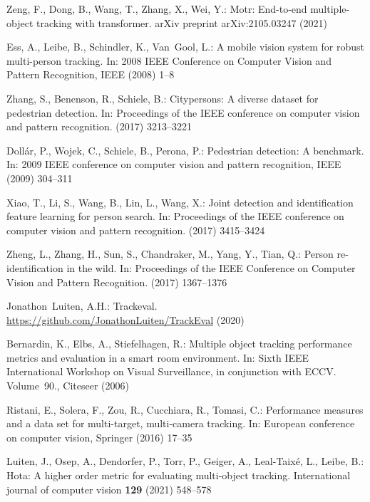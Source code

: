 \documentclass[runningheads]{llncs}
\begin{document}
\begin{thebibliography}{10}
Zeng, F., Dong, B., Wang, T., Zhang, X., Wei, Y.:
\newblock Motr: End-to-end multiple-object tracking with transformer.
\newblock arXiv preprint arXiv:2105.03247 (2021)

Ess, A., Leibe, B., Schindler, K., Van~Gool, L.:
\newblock A mobile vision system for robust multi-person tracking.
\newblock In: 2008 IEEE Conference on Computer Vision and Pattern Recognition,
  IEEE (2008)  1--8

Zhang, S., Benenson, R., Schiele, B.:
\newblock Citypersons: A diverse dataset for pedestrian detection.
\newblock In: Proceedings of the IEEE conference on computer vision and pattern
  recognition. (2017)  3213--3221

Doll{\'a}r, P., Wojek, C., Schiele, B., Perona, P.:
\newblock Pedestrian detection: A benchmark.
\newblock In: 2009 IEEE conference on computer vision and pattern recognition,
  IEEE (2009)  304--311

Xiao, T., Li, S., Wang, B., Lin, L., Wang, X.:
\newblock Joint detection and identification feature learning for person
  search.
\newblock In: Proceedings of the IEEE conference on computer vision and pattern
  recognition. (2017)  3415--3424

Zheng, L., Zhang, H., Sun, S., Chandraker, M., Yang, Y., Tian, Q.:
\newblock Person re-identification in the wild.
\newblock In: Proceedings of the IEEE Conference on Computer Vision and Pattern
  Recognition. (2017)  1367--1376

Jonathon~Luiten, A.H.:
\newblock Trackeval.
\newblock \url{https://github.com/JonathonLuiten/TrackEval} (2020)

Bernardin, K., Elbs, A., Stiefelhagen, R.:
\newblock Multiple object tracking performance metrics and evaluation in a
  smart room environment.
\newblock In: Sixth IEEE International Workshop on Visual Surveillance, in
  conjunction with ECCV. Volume~90., Citeseer (2006)

Ristani, E., Solera, F., Zou, R., Cucchiara, R., Tomasi, C.:
\newblock Performance measures and a data set for multi-target, multi-camera
  tracking.
\newblock In: European conference on computer vision, Springer (2016)  17--35

Luiten, J., Osep, A., Dendorfer, P., Torr, P., Geiger, A., Leal-Taix{\'e}, L.,
  Leibe, B.:
\newblock Hota: A higher order metric for evaluating multi-object tracking.
\newblock International journal of computer vision \textbf{129} (2021)
  548--578


\end{thebibliography}
\end{document}
